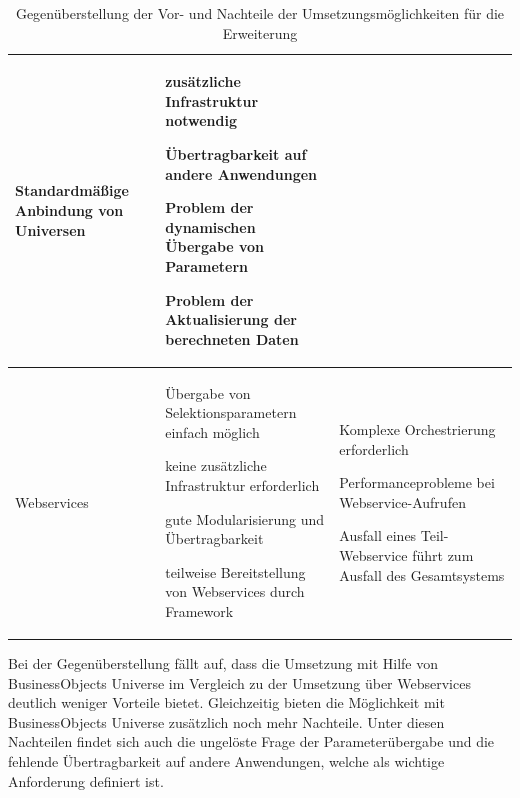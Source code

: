 \begin{onehalfspacing}
{\begin{table}[htbp]
\begin{tabular}{| l | >{\centering\arraybackslash} m{5cm} | >{\centering\arraybackslash} m{5cm} |}
\begin{seList}
\item Standardmäßige Anbindung von Universen
\end{seList}

&


\begin{seList}
\item zusätzliche Infrastruktur notwendig
\item Übertragbarkeit auf andere Anwendungen
\item Problem der dynamischen Übergabe von Parametern
\item Problem der Aktualisierung der berechneten Daten
\end{seList}


\\	\hline
Webservices 			& 

\begin{seList}
\item Übergabe von Selektionsparametern einfach möglich
\item keine zusätzliche Infrastruktur erforderlich
\item gute Modularisierung und Übertragbarkeit
\item teilweise Bereitstellung von Webservices durch Framework
\end{seList}

& 


\begin{seList}
\item Komplexe Orchestrierung erforderlich
\item Performanceprobleme bei Webservice-Aufrufen
\item Ausfall eines Teil-Webservice führt zum Ausfall des Gesamtsystems
\end{seList}

\\	\hline
\end{tabular} 
\caption{Gegenüberstellung der Vor- und Nachteile der Umsetzungsmöglichkeiten für die Erweiterung \label{table:vergleich_umsetzung}}
\end{table}
}

Bei der Gegenüberstellung fällt auf, dass die Umsetzung mit Hilfe von BusinessObjects Universe im Vergleich zu der Umsetzung über Webservices deutlich weniger Vorteile bietet. Gleichzeitig bieten die Möglichkeit mit BusinessObjects Universe zusätzlich noch mehr Nachteile. Unter diesen Nachteilen findet sich auch die ungelöste Frage der Parameterübergabe und die fehlende Übertragbarkeit auf andere Anwendungen, welche als wichtige Anforderung definiert ist.


\end{onehalfspacing}
